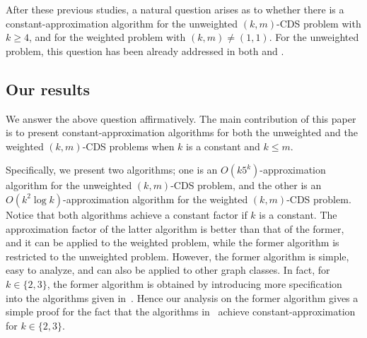 \documentclass[11pt]{article}
\begin{document}
After these previous studies,
a natural question arises as to whether there
is a constant-approximation algorithm
for the unweighted $(k,m)$-CDS problem with $k \geq 4$,
and for the weighted problem with $(k,m)\neq (1,1)$.
For the unweighted problem, this question has been already addressed in
both \cite{WangKAGLZW13} and \cite{Wang:2015}.


\subsection{Our results}
\label{sec.ourresults}
We answer the above question affirmatively.
The main contribution of this paper is to present
constant-approximation algorithms
for both the unweighted and the weighted $(k,m)$-CDS problems
when $k$ is a constant and $k \leq m$.

Specifically, we present two algorithms;
one is an $O(k 5^k)$-approximation algorithm for the unweighted $(k,m)$-CDS problem,
and the other is an $O(k^2 \log k)$-approximation algorithm for the
weighted $(k,m)$-CDS problem.
Notice that both algorithms achieve a constant factor if $k$ is a constant.
The approximation factor of the latter algorithm is better than that of
the former,
and it can be applied to the weighted problem, while the former algorithm is
restricted to the unweighted problem.
However, the former algorithm is simple, easy to analyze,
and can also be applied to other graph classes.
In fact,
 for $k\in \{2,3\}$,
 the former algorithm is obtained by introducing more
 specification into the algorithms
 given in~\cite{Shang:2007jg,Wang:2015}.
 Hence our analysis on the former algorithm gives a simple proof for the
 fact that the algorithms in~\cite{Shang:2007jg,Wang:2015} achieve
 constant-approximation for $k\in \{2,3\}$.
\end{document}
